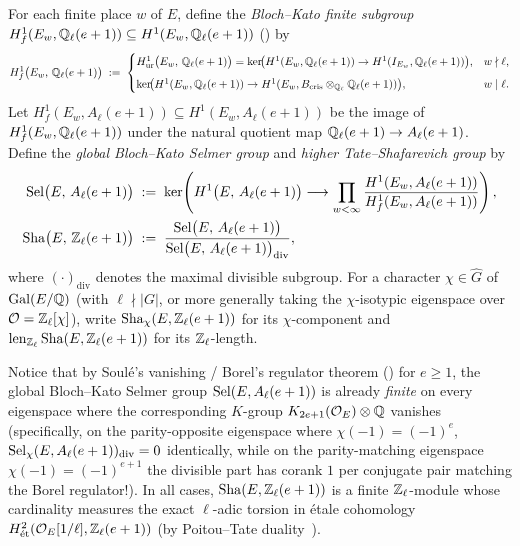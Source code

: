 \begin{definition}
\label{def:18:bk-sha}
For each finite place $w$ of $E$, define the \emph{Bloch--Kato finite subgroup} $H^1_f(E_w, \mathbb{Q}_\ell(e+1)) \subseteq H^1(E_w, \mathbb{Q}_\ell(e+1))$ () by
\begin{equation}
\label{eq:18:bk-cond}
  H^1_f\bigl(E_w,\, \mathbb{Q}_\ell(e+1)\bigr) \;:=\;
  \begin{cases}
    H^1_{\mathrm{ur}}\bigl(E_w,\, \mathbb{Q}_\ell(e+1)\bigr) = \ker\!\bigl(H^1(E_w, \mathbb{Q}_\ell(e+1)) \to H^1(I_{E_w}, \mathbb{Q}_\ell(e+1))\bigr), & w \nmid \ell, \\[6pt]
    \ker\!\bigl(H^1(E_w, \mathbb{Q}_\ell(e+1)) \to H^1(E_w, B_{\mathrm{cris}} \otimes_{\mathbb{Q}_\ell} \mathbb{Q}_\ell(e+1))\bigr), & w \mid \ell.
  \end{cases}
\end{equation}
Let $H^1_f(E_w, A_\ell(e+1)) \subseteq H^1(E_w, A_\ell(e+1))$ be the image of $H^1_f(E_w, \mathbb{Q}_\ell(e+1))$ under the natural quotient map $\mathbb{Q}_\ell(e+1) \to A_\ell(e+1)$. Define the \emph{global Bloch--Kato Selmer group} and \emph{higher Tate--Shafarevich group} by
\begin{align}
\label{eq:18:sha-def}
  \mathrm{Sel}\bigl(E,\, A_\ell(e+1)\bigr)
  &\;:=\; \ker\!\left(H^1\bigl(E,\, A_\ell(e+1)\bigr) \longrightarrow \prod_{w < \infty} \frac{H^1(E_w, A_\ell(e+1))}{H^1_f(E_w, A_\ell(e+1))}\right), \\
  \mathrm{Sha}\bigl(E,\, \mathbb{Z}_\ell(e+1)\bigr)
  &\;:=\; \frac{\mathrm{Sel}\bigl(E,\, A_\ell(e+1)\bigr)}{\mathrm{Sel}\bigl(E,\, A_\ell(e+1)\bigr)_{\mathrm{div}}},
\end{align}
where $(\cdot)_{\mathrm{div}}$ denotes the maximal divisible subgroup. For a character $\chi \in \widehat{G}$ of $\mathrm{Gal}(E/\mathbb{Q})$ (with $\ell \nmid |G|$, or more generally taking the $\chi$-isotypic eigenspace over $\mathcal{O} = \mathbb{Z}_\ell[\chi]$), write $\mathrm{Sha}_\chi(E, \mathbb{Z}_\ell(e+1))$ for its $\chi$-component and $\operatorname{len}_{\mathbb{Z}_\ell}\mathrm{Sha}(E, \mathbb{Z}_\ell(e+1))$ for its $\mathbb{Z}_\ell$-length.
\end{definition}

Notice that by Soul\'e's vanishing / Borel's regulator theorem (\cite{Borel1974,Soule1999}) for $e \ge 1$, the global Bloch--Kato Selmer group $\mathrm{Sel}(E, A_\ell(e+1))$ is already \emph{finite} on every eigenspace where the corresponding $K$-group $K_{2e+1}(\mathcal{O}_E) \otimes \mathbb{Q}$ vanishes (specifically, on the parity-opposite eigenspace where $\chi(-1) = (-1)^e$, $\mathrm{Sel}_\chi(E, A_\ell(e+1))_{\mathrm{div}} = 0$ identically, while on the parity-matching eigenspace $\chi(-1) = (-1)^{e+1}$ the divisible part has corank $1$ per conjugate pair matching the Borel regulator!). In all cases, $\mathrm{Sha}(E, \mathbb{Z}_\ell(e+1))$ is a finite $\mathbb{Z}_\ell$-module whose cardinality measures the exact $\ell$-adic torsion in \'etale cohomology $H^2_{\text{\'et}}(\mathcal{O}_E[1/\ell], \mathbb{Z}_\ell(e+1))$ (by Poitou--Tate duality~\cite{Milne2006,NSW2008}).

